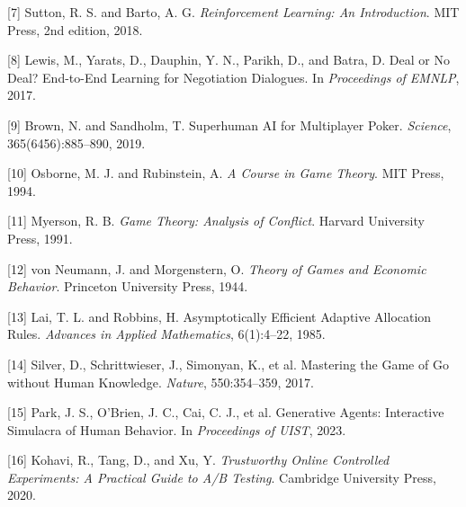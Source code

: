 \documentclass{article}
\begin{document}
[7] Sutton, R. S. and Barto, A. G. \emph{Reinforcement Learning: An Introduction}. MIT Press, 2nd edition, 2018.

[8] Lewis, M., Yarats, D., Dauphin, Y. N., Parikh, D., and Batra, D. Deal or No Deal? End-to-End Learning for Negotiation Dialogues. In \emph{Proceedings of EMNLP}, 2017.

[9] Brown, N. and Sandholm, T. Superhuman AI for Multiplayer Poker. \emph{Science}, 365(6456):885--890, 2019.

[10] Osborne, M. J. and Rubinstein, A. \emph{A Course in Game Theory}. MIT Press, 1994.

[11] Myerson, R. B. \emph{Game Theory: Analysis of Conflict}. Harvard University Press, 1991.

[12] von Neumann, J. and Morgenstern, O. \emph{Theory of Games and Economic Behavior}. Princeton University Press, 1944.

[13] Lai, T. L. and Robbins, H. Asymptotically Efficient Adaptive Allocation Rules. \emph{Advances in Applied Mathematics}, 6(1):4--22, 1985.

[14] Silver, D., Schrittwieser, J., Simonyan, K., et al. Mastering the Game of Go without Human Knowledge. \emph{Nature}, 550:354--359, 2017.

[15] Park, J. S., O'Brien, J. C., Cai, C. J., et al. Generative Agents: Interactive Simulacra of Human Behavior. In \emph{Proceedings of UIST}, 2023.

[16] Kohavi, R., Tang, D., and Xu, Y. \emph{Trustworthy Online Controlled Experiments: A Practical Guide to A/B Testing}. Cambridge University Press, 2020.
\end{document}
